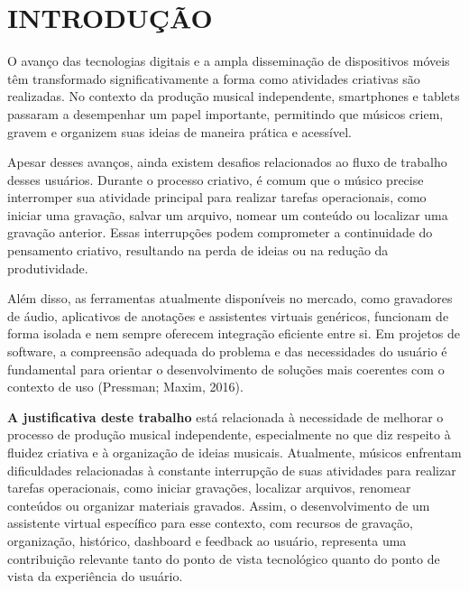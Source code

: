 \documentclass[12pt,oneside,a4paper,brazil,final]{abntex2}
\begin{document}


\chapter{INTRODUÇÃO}



O avanço das tecnologias digitais e a ampla disseminação de dispositivos móveis têm transformado significativamente a forma como atividades criativas são realizadas. No contexto da produção musical independente, smartphones e tablets passaram a desempenhar um papel importante, permitindo que músicos criem, gravem e organizem suas ideias de maneira prática e acessível.



Apesar desses avanços, ainda existem desafios relacionados ao fluxo de trabalho desses usuários. Durante o processo criativo, é comum que o músico precise interromper sua atividade principal para realizar tarefas operacionais, como iniciar uma gravação, salvar um arquivo, nomear um conteúdo ou localizar uma gravação anterior. Essas interrupções podem comprometer a continuidade do pensamento criativo, resultando na perda de ideias ou na redução da produtividade.



Além disso, as ferramentas atualmente disponíveis no mercado, como gravadores de áudio, aplicativos de anotações e assistentes virtuais genéricos, funcionam de forma isolada e nem sempre oferecem integração eficiente entre si. Em projetos de software, a compreensão adequada do problema e das necessidades do usuário é fundamental para orientar o desenvolvimento de soluções mais coerentes com o contexto de uso (Pressman; Maxim, 2016).


\textbf{A justificativa deste trabalho} está relacionada à necessidade de melhorar o processo de produção musical independente, especialmente no que diz respeito à fluidez criativa e à organização de ideias musicais. Atualmente, músicos enfrentam dificuldades relacionadas à constante interrupção de suas atividades para realizar tarefas operacionais, como iniciar gravações, localizar arquivos, renomear conteúdos ou organizar materiais gravados. Assim, o desenvolvimento de um assistente virtual específico para esse contexto, com recursos de gravação, organização, histórico, dashboard e feedback ao usuário, representa uma contribuição relevante tanto do ponto de vista tecnológico quanto do ponto de vista da experiência do usuário.
\end{document}
